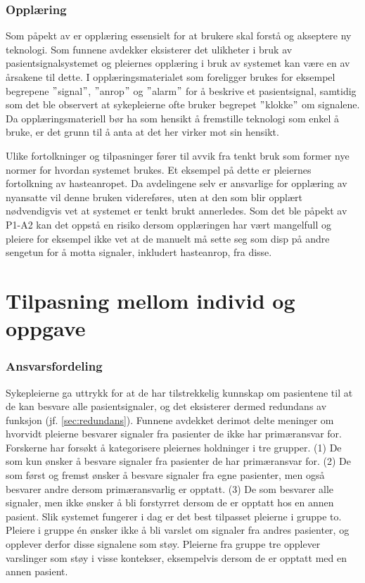\subsubsection{Opplæring}	 
Som påpekt av \citet{Venkatesh99} er opplæring essensielt for at brukere skal forstå og akseptere ny teknologi.	Som funnene avdekker eksisterer det ulikheter i bruk av pasientsignalsystemet og pleiernes opplæring i bruk av systemet kan være en av årsakene til dette. I opplæringsmaterialet som foreligger brukes for eksempel begrepene $"$signal$"$, $"$anrop$"$ og $"$alarm$"$ for å beskrive et pasientsignal, samtidig som det ble observert at sykepleierne ofte bruker begrepet $"$klokke$"$ om signalene. Da opplæringsmateriell bør ha som hensikt å fremstille teknologi som enkel å bruke, er det grunn til å anta at det her virker mot sin hensikt.

\noindent
Ulike fortolkninger og tilpasninger fører til avvik fra tenkt bruk som former nye normer for hvordan systemet brukes. Et eksempel på dette er pleiernes fortolkning av hasteanropet. Da avdelingene selv er ansvarlige for opplæring av nyansatte vil denne bruken videreføres, uten at den som blir opplært nødvendigvis vet at systemet er tenkt brukt annerledes. Som det ble påpekt av P1-A2 kan det oppstå en risiko dersom opplæringen har vært mangelfull og pleiere for eksempel ikke vet at de manuelt må sette seg som disp på andre sengetun for å motta signaler, inkludert hasteanrop, fra disse.

\section{Tilpasning mellom individ og oppgave}

\subsubsection{Ansvarsfordeling}
Sykepleierne ga uttrykk for at de har tilstrekkelig kunnskap om pasientene til at de kan besvare alle pasientsignaler, og det eksisterer dermed redundans av funksjon (jf. \ref{sec:redundans}). Funnene avdekket derimot delte meninger om hvorvidt pleierne besvarer signaler fra pasienter de ikke har primæransvar for. Forskerne har forsøkt å kategorisere pleiernes holdninger i tre grupper. (1) De som kun ønsker å besvare signaler fra pasienter de har primæransvar for. (2) De som  først og fremst ønsker å besvare signaler fra egne pasienter, men også besvarer andre dersom primæransvarlig er opptatt. (3) De som besvarer alle signaler, men ikke ønsker å bli forstyrret dersom de er opptatt hos en annen pasient. Slik systemet fungerer i dag er det best tilpasset pleierne i gruppe to. Pleiere i gruppe én ønsker ikke å bli varslet om signaler fra andres pasienter, og opplever derfor disse signalene som støy. Pleierne fra gruppe tre opplever varslinger som støy i visse kontekser, eksempelvis dersom de er opptatt med en annen pasient.

